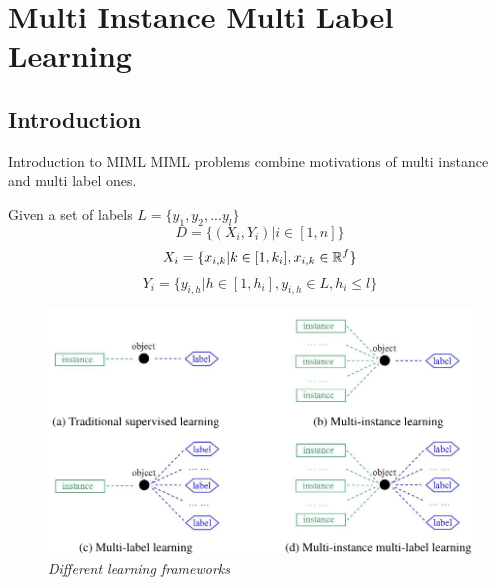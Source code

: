 \section{Multi Instance Multi Label Learning}
 
\subsection*{Introduction}
\begin{frame}{Introduction to MIML}
	MIML problems combine motivations of multi instance and multi label ones.
	
	Given a set of labels $L = \{y_1, y_2,... y_l\}$
	$$D = \{(X_i, Y_i) | i \in [1, n]\}$$
	$$X_i = \{x_{i,k} | k \in [1, k_i], x_{i,k} \in \mathbb{R}^f\}$$
	$$Y_i = \{y_{i,h} | h \in [1, h_i], y_{i,h} \in L, h_i \leq l\}$$
	\begin{figure}[htbp]
		\centering
		\includegraphics[scale = 0.20]{./images/confronto-miml.png}
		\caption{\textit{Different learning frameworks}}
	\end{figure}
	\begin{flushright}
		\cite{miml1}
	\end{flushright}
\end{frame}

